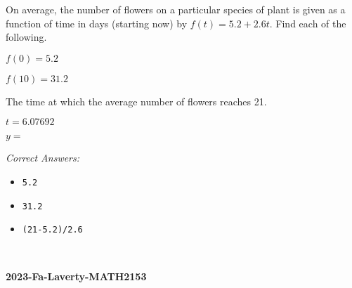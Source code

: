 \documentclass[11pt]{amsart}
\newcommand{\nocolumns}{}
\begin{document}
\begin{multicols}{2}
{On average, the number of flowers on a particular species of plant is given as a function of time in days (starting now) by \(f(t) = {5.2+2.6t}\).  Find each of the following.

{
 \(f(0) = {5.2}\)

 \(f(10) = {31.2}\)

 The time at which the average number of flowers reaches 21.
{
  \(t = {6.07692}\)
\par}%
 \(y =\)
\par}%

\par}%
\par 
\par{\small{\it Correct Answers:}
\vspace{-\parskip}\begin{itemize}
\item\begin{verbatim}5.2\end{verbatim}
\item\begin{verbatim}31.2\end{verbatim}
\item\begin{verbatim}(21-5.2)/2.6\end{verbatim}
\end{itemize}}\par
\leavevmode\\\relax 
{}



\newpage%
\setcounter{page}{1}%

\ifdefined\nocolumns\else \end{multicols}\fi

\hfill
{\large \bf {2023-Fa-Laverty-MATH2153}}
\par
{}
\par\noindent \bigskip
\end{document}
